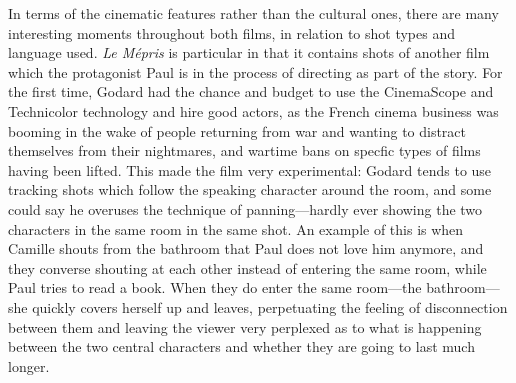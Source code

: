 \documentclass[12pt,a4paper]{article}
\begin{document}
In terms of the cinematic features rather than the cultural ones,
there are many interesting moments throughout both films, in relation
to shot types and language used. \textit{Le Mépris} is particular in
that it contains shots of another film which the protagonist Paul is
in the process of directing as part of the story. For the first time,
Godard had the chance and budget to use the CinemaScope and
Technicolor technology and hire good actors, as the French cinema
business was booming in the wake of people returning from war and
wanting to distract themselves from their nightmares, and wartime bans
on specfic types of films having been lifted. This made the film very
experimental: Godard tends to use tracking shots which follow the
speaking character around the room, and some could say he overuses the
technique of panning---hardly ever showing the two characters in the
same room in the same shot. An example of this is when Camille shouts
from the bathroom that Paul does not love him anymore, and they
converse shouting at each other instead of entering the same room,
while Paul tries to read a book. When they do enter the same
room---the bathroom---she quickly covers herself up and leaves,
perpetuating the feeling of disconnection between them and leaving the
viewer very perplexed as to what is happening between the two central
characters and whether they are going to last much longer.\\
\end{document}
